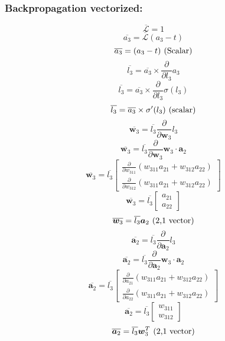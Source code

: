 \documentclass{article}
\begin{document}
\subsubsection{Backpropagation vectorized:}
\begin{equation}\overline{\mathcal{L}} = 1\end{equation}
\[\overline{a_3} = \overline{\mathcal{L}} (a_3 - t)\]
\[\overline{a_3} = (a_3 - t) \hspace*{0.125cm}(\text{Scalar})\]
\[\overline{l_3} = \overline{a_3} \times \frac{\partial}{\partial{l_3}} a_3\]
\[\overline{l_3} = \overline{a_3} \times \frac{\partial}{\partial{l_3}} \sigma(l_3)\]
\begin{equation}\overline{l_3} = \overline{a_3} \times \sigma ' (l_3) \hspace*{0.125cm} (\text{scalar})\end{equation}
\[\overline{\bm{w}_3} = \overline{l_3} \frac{\partial}{\partial{\bm{w}_3}} l_3\]
\[\overline{\bm{w}_3} = \overline{l_3} \frac{\partial}{\partial{\bm{w}_3}} \bm{w}_3 \cdot \bm{a}_2\]
\[\overline{\bm{w}_3} = \overline{l_3} \begin{bmatrix}\frac{\partial{}}{\partial{w_{311}}} (w_{311}a_{21} + w_{312}a_{22})\\ \frac{\partial}{\partial{w_{312}}}(w_{311}a_{21} + w_{312}a_{22})\end{bmatrix}\]
\[\overline{\bm{w}_3} = \overline{l_3} \begin{bmatrix}a_{21}\\ a_{22}\end{bmatrix}\]
\begin{equation}\overline{\bm{w}_3} = \overline{l_3} \bm{a}_2 \hspace*{0.125cm} (\text{2,1 vector})\end{equation}
\[\overline{\bm{a}_2} = \overline{l_3} \frac{\partial}{\partial{\bm{a}_2}} l_3\]
\[\overline{\bm{a}_2} = \overline{l_3} \frac{\partial}{\partial{\bm{a}_2}} \bm{w}_3 \cdot \bm{a}_2\]
\[\overline{\bm{a}_2} = \overline{l_3} \begin{bmatrix}\frac{\partial{}}{\partial{a_{21}}} (w_{311}a_{21} + w_{312}a_{22})\\ \frac{\partial}{\partial{a_{22}}}(w_{311}a_{21} + w_{312}a_{22})\end{bmatrix}\]
\[\overline{\bm{a}_2} = \overline{l_3} \begin{bmatrix}w_{311} \\ w_{312}\end{bmatrix}\]
\begin{equation}\overline{\bm{a}_2} = \overline{l_3} \bm{w}_3^T \hspace*{0.125cm} (\text{2,1 vector})\end{equation}
\end{document}
